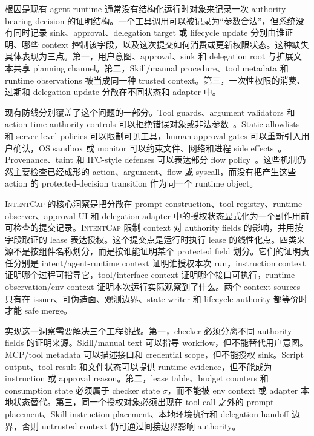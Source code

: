 \documentclass[UTF8,a4paper,11pt]{ctexart}
\newcommand{\sys}{\textsc{IntentCap}\xspace}
\begin{document}
根因是现有 agent runtime 通常没有结构化运行时对象来记录一次 authority-bearing decision 的证明结构。一个工具调用可以被记录为“参数合法”，但系统没有同时记录 sink、approval、delegation target 或 lifecycle update 分别由谁证明、哪些 context 控制该字段，以及这次提交如何消费或更新权限状态。这种缺失具体表现为三点。第一，用户意图、approval、sink 和 delegation root 与扩展文本共享 planning channel。第二，Skill/manual procedure、tool metadata 和 runtime observations 被当成同一种 trusted context。第三，一次性权限的消费、过期和 delegation update 分散在不同状态和 adapter 中。

现有防线分别覆盖了这个问题的一部分。Tool guards、argument validators 和 action-time authority controls 可以拒绝错误对象或非法参数~\cite{authgraph,pact,airguard}。Static allowlists 和 server-level policies 可以限制可见工具，human approval gates 可以重新引入用户确认，OS sandbox 或 monitor 可以约束文件、网络和进程 side effects~\cite{actplane}。Provenance、taint 和 IFC-style defenses 可以表达部分 flow policy~\cite{camel,prompt-flow-integrity,fides,rtbas,neurotaint}。这些机制仍然主要检查已经成形的 action、argument、flow 或 syscall，而没有把产生这些 action 的 protected-decision transition 作为同一个 runtime object。

\sys 的核心洞察是把分散在 prompt construction、tool registry、runtime observer、approval UI 和 delegation adapter 中的授权状态显式化为一个副作用前可检查的提交记录。\sys 限制 context 对 authority fields 的影响，并用按字段取证的 lease 表达授权。这个提交点是运行时执行 lease 的线性化点。四类来源不是按组件名称划分，而是按谁能证明某个 protected field 划分。它们的证明责任分别是 intent/agent-runtime context 证明谁授权本次 run，instruction context 证明哪个过程可指导它，tool/interface context 证明哪个接口可执行，runtime-observation/env context 证明本次运行实际观察到了什么。两个 context sources 只有在 issuer、可伪造面、观测边界、state writer 和 lifecycle authority 都等价时才能 safe merge。

实现这一洞察需要解决三个工程挑战。第一，checker 必须分离不同 authority fields 的证明来源。Skill/manual text 可以指导 workflow，但不能替代用户意图。MCP/tool metadata 可以描述接口和 credential scope，但不能授权 sink。Script output、tool result 和文件状态可以提供 runtime evidence，但不能成为 instruction 或 approval reason。第二，lease table、budget counters 和 consumption state 必须属于 checker state \(\sigma\)，而不能被 env context 或 adapter 本地状态替代。第三，同一个授权对象必须出现在 tool call 之外的 prompt placement、Skill instruction placement、本地环境执行和 delegation handoff 边界，否则 untrusted context 仍可通过间接边界影响 authority。
\end{document}
